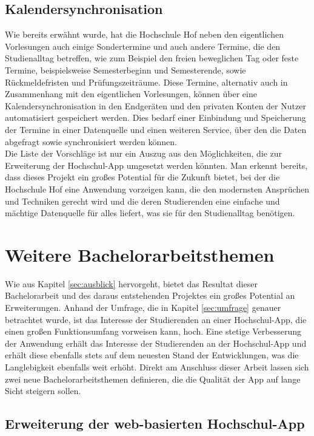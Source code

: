 \subsection*{Kalendersynchronisation}

Wie bereits erwähnt wurde, hat die Hochschule Hof neben den eigentlichen Vorlesungen auch einige Sondertermine und auch andere Termine, die den Studienalltag betreffen, wie zum Beispiel den freien beweglichen Tag oder feste Termine, beispielsweise Semesterbeginn und Semesterende, sowie Rückmeldefristen und Prüfungszeiträume. Diese Termine, alternativ auch in Zusammenhang mit den eigentlichen Vorlesungen, können über eine Kalendersynchronisation in den Endgeräten und den privaten Konten der Nutzer automatisiert gespeichert werden. Dies bedarf einer Einbindung und Speicherung der Termine in einer Datenquelle und einen weiteren Service, über den die Daten abgefragt sowie synchronisiert werden können.
\\
\linebreak
Die Liste der Vorschläge ist nur ein Auszug aus den Möglichkeiten, die zur Erweiterung der Hochschul-\ac{App} umgesetzt werden könnten. Man erkennt bereits, dass dieses Projekt ein großes Potential für die Zukunft bietet, bei der die Hochschule Hof eine Anwendung vorzeigen kann, die den modernsten Ansprüchen und Techniken gerecht wird und die deren Studierenden eine einfache und mächtige Datenquelle für alles liefert, was sie für den Studienalltag benötigen.

\section{Weitere Bachelorarbeitsthemen}

Wie aus Kapitel \ref{sec:ausblick} hervorgeht, bietet das Resultat dieser Bachelorarbeit und des daraus entstehenden Projektes ein großes Potential an Erweiterungen. Anhand der Umfrage, die in Kapitel \ref{sec:umfrage} genauer betrachtet wurde, ist das Interesse der Studierenden an einer Hochschul-\ac{App}, die einen großen Funktionsumfang vorweisen kann, hoch. Eine stetige Verbesserung der Anwendung erhält das Interesse der Studierenden an der Hochschul-\ac{App} und erhält diese ebenfalls stets auf dem neuesten Stand der Entwicklungen, was die Langlebigkeit ebenfalls weit erhöht. Direkt am Anschluss dieser Arbeit lassen sich zwei neue Bachelorarbeitsthemen definieren, die die Qualität der \ac{App} auf lange Sicht steigern sollen.

\subsection*{Erweiterung der web-basierten Hochschul-\ac{App}}

